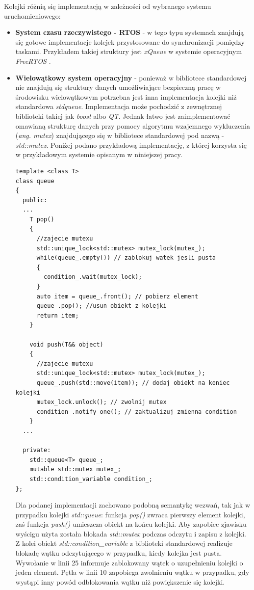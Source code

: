 Kolejki różnią się implementacją w zależności od wybranego systemu uruchomieniowego:
\begin{itemize}
\item{\textbf{System czasu rzeczywistego - RTOS}} - w tego typu systemach znajdują się gotowe implementacje kolejek przystosowane do synchronizacji pomiędzy taskami. Przykładem takiej struktury jest \textit{xQueue} w systemie operacyjnym \textit{FreeRTOS} \cite{freertos}.
\item{\textbf{Wielowątkowy system operacyjny}} - ponieważ w bibliotece standardowej nie znajdują się struktury danych umożliwiające bezpieczną pracę w środowisku wielowątkowym potrzebna jest inna implementacja kolejki niż standardowa \textit{stdqueue}. Implementacja może pochodzić z zewnętrznej biblioteki takiej jak \textit{boost} albo \textit{QT}. Jednak łatwo jest zaimplementować omawianą strukturę danych przy pomocy algorytmu wzajemnego wykluczenia (\textit{ang. mutex}) znajdującego się w
    bibliotece standardowej pod nazwą - \textit{std::mutex}. Poniżej podano przykładową implementację, z której korzysta się w przykładowym systemie opisanym w niniejszej pracy.
\begin{lstlisting}[style=lst:cpp, caption=Bezpieczna wątkowo kolejka\label{lst:queue}]
template <class T>
class queue
{
  public:
  ...
    T pop()
    {
      //zajecie mutexu
      std::unique_lock<std::mutex> mutex_lock(mutex_);
      while(queue_.empty()) // zablokuj watek jesli pusta
      {
        condition_.wait(mutex_lock);
      }
      auto item = queue_.front(); // pobierz element
      queue_.pop(); //usun obiekt z kolejki
      return item;
    }

    void push(T&& object)
    {
      //zajecie mutexu
      std::unique_lock<std::mutex> mutex_lock(mutex_);
      queue_.push(std::move(item)); // dodaj obiekt na koniec kolejki
      mutex_lock.unlock(); // zwolnij mutex
      condition_.notify_one(); // zaktualizuj zmienna condition_
    }
  ...

  private:
    std::queue<T> queue_;
    mutable std::mutex mutex_;
    std::condition_variable condition_;
};
\end{lstlisting}

Dla podanej implementacji zachowano podobną semantykę wezwań, tak jak w przypadku kolejki \textit{std::queue}: funkcja \textit{pop()} zwraca pierwszy element kolejki, zaś funkcja \textit{push()} umieszcza obiekt na końcu kolejki. Aby zapobiec zjawisku wyścigu użyta została blokada \textit{std::mutex} podczas odczytu i zapisu z kolejki. Z kolei obiekt \textit{std::condition\_variable} z biblioteki standardowej realizuje blokadę wątku odczytującego w przypadku, kiedy kolejka jest pusta. Wywołanie
        w linii 25 informuje zablokowany wątek o uzupełnieniu kolejki o jeden element. Pętla w linii 10 zapobiega zwolnieniu wątku w przypadku, gdy wystąpi inny powód odblokowania wątku niż powiększenie się kolejki.



\end{itemize}

